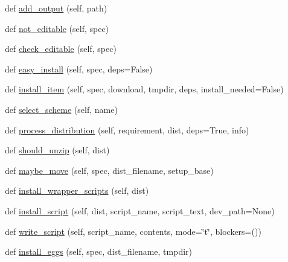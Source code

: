 \begin{DoxyCompactItemize}
def \hyperlink{classsetuptools_1_1command_1_1easy__install_1_1easy__install_aaf0949c3bcc6f3247e0c87b5dff2a070}{add\+\_\+output} (self, path)
\item 
def \hyperlink{classsetuptools_1_1command_1_1easy__install_1_1easy__install_acc62163c8fa871e362c99f99bcba1326}{not\+\_\+editable} (self, spec)
\item 
def \hyperlink{classsetuptools_1_1command_1_1easy__install_1_1easy__install_a2c472da3ca0e63cd65ee61e2f5429aa8}{check\+\_\+editable} (self, spec)
\item 
def \hyperlink{classsetuptools_1_1command_1_1easy__install_1_1easy__install_ac31f17115e3242d7bb4a09f30d917682}{easy\+\_\+install} (self, spec, deps=False)
\item 
def \hyperlink{classsetuptools_1_1command_1_1easy__install_1_1easy__install_a436bb487b6dcb071193cdf4cc5dd9f3b}{install\+\_\+item} (self, spec, download, tmpdir, deps, install\+\_\+needed=False)
\item 
def \hyperlink{classsetuptools_1_1command_1_1easy__install_1_1easy__install_a0497878cc23ab12f8e7f1ddef60c0817}{select\+\_\+scheme} (self, name)
\item 
def \hyperlink{classsetuptools_1_1command_1_1easy__install_1_1easy__install_a4c4983dc2ff927d50c67f182caa2fd38}{process\+\_\+distribution} (self, requirement, dist, deps=True, info)
\item 
def \hyperlink{classsetuptools_1_1command_1_1easy__install_1_1easy__install_a596c58dba7a122d23ddc5dd0d35e9809}{should\+\_\+unzip} (self, dist)
\item 
def \hyperlink{classsetuptools_1_1command_1_1easy__install_1_1easy__install_a083c308310d7d4def543311f6d1b1c8c}{maybe\+\_\+move} (self, spec, dist\+\_\+filename, setup\+\_\+base)
\item 
def \hyperlink{classsetuptools_1_1command_1_1easy__install_1_1easy__install_a35dd854e1ef13388ddc20486d5f7e96d}{install\+\_\+wrapper\+\_\+scripts} (self, dist)
\item 
def \hyperlink{classsetuptools_1_1command_1_1easy__install_1_1easy__install_af6e499b6e280b6f2a69e8a3d4d82e7a5}{install\+\_\+script} (self, dist, script\+\_\+name, script\+\_\+text, dev\+\_\+path=None)
\item 
def \hyperlink{classsetuptools_1_1command_1_1easy__install_1_1easy__install_ac39a37c389cdaef20825f497e941c018}{write\+\_\+script} (self, script\+\_\+name, contents, mode=\char`\"{}t\char`\"{}, blockers=())
\item 
def \hyperlink{classsetuptools_1_1command_1_1easy__install_1_1easy__install_afb2b25bc2760450a095011037b5bc5f5}{install\+\_\+eggs} (self, spec, dist\+\_\+filename, tmpdir)

\end{DoxyCompactItemize}
